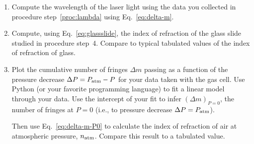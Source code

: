 \begin{enumerate}
\item Compute the wavelength of the laser light using the data you collected in
  procedure step~\ref{proc:lambda} using Eq.~\ref{eq:delta-m}.

\item Compute, using Eq.~\ref{eq:glassslide}, the index of refraction of the
  glass slide studied in procedure step~4. Compare to typical tabulated values
  of the index of refraction of glass.

\item Plot the cumulative number of fringes $\Delta m$ passing 
as a function of the pressure decrease $\Delta P = P_{\rm atm} - 
P$ for your data taken with the gas cell. Use Python (or your favorite
programming language) to fit a linear model through your data.
Use the intercept of your fit to infer $(\Delta m)_{P=0}$, the number of fringes
at $P=0$ (i.e., to pressure decrease $\Delta P = P_{\rm atm}$). 

Then use Eq.~\ref{eq:delta-m-P0} to calculate the index of refraction of air 
at atmospheric pressure, $n_{\rm atm}$. Compare this result to a tabulated 
value.

\end{enumerate}

